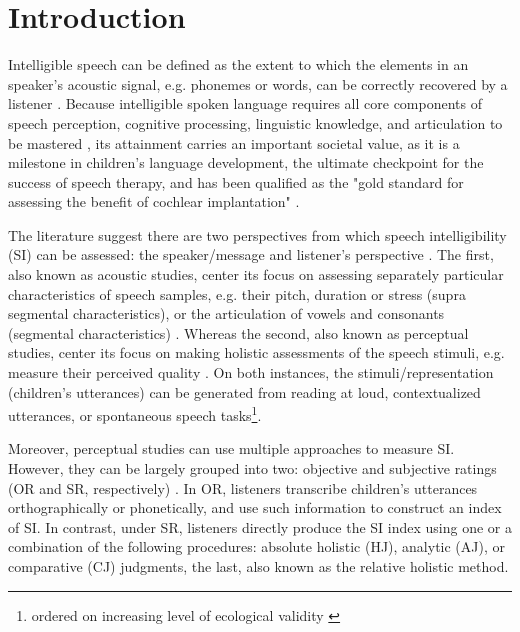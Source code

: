 \section{Introduction}

Intelligible speech can be defined as the extent to which the elements in an speaker's acoustic signal, e.g. phonemes or words, can be correctly recovered by a listener \citep{Kent_et_al_1989, Whitehill_et_al_2004, vanHeuven_2008, Freeman_et_al_2017}. Because intelligible spoken language requires all core components of speech perception, cognitive processing, linguistic knowledge, and articulation to be mastered \citep{Freeman_et_al_2017}, its attainment carries an important societal value, as it is a milestone in children's language development, the ultimate checkpoint for the success of speech therapy, and has been qualified as the "gold standard for assessing the benefit of cochlear implantation" \citep{Chin_et_al_2012}. 

The literature suggest there are two perspectives from which speech intelligibility (SI) can be assessed: the speaker/message and listener's perspective \citep{Boonen_et_al_2020, Boonen_et_al_2021}. The first, also known as acoustic studies, center its focus on assessing separately particular characteristics of speech samples, e.g. their pitch, duration or stress (supra segmental characteristics), or the articulation of vowels and consonants (segmental characteristics) \citep{Rowe_et_al_2018}. Whereas the second, also known as perceptual studies, center its focus on making holistic assessments of the speech stimuli, e.g. measure their perceived quality \citep{Boonen_et_al_2020, Boonen_et_al_2021}. On both instances, the stimuli/representation (children's utterances) can be generated from reading at loud, contextualized utterances, or spontaneous speech tasks\footnote{ordered on increasing level of ecological validity \citep{Flipsen_2006,Ertmer_2011}}.

\begin{comment}
Based on their description, it seems that that perceptual studies are more subjective than acoustic studies, as they do not rely on "objective" measurements, i.e. time duration, wave amplitude, among others, available in the former. However, for the case of SI, there are objective and subjective assessment methodologies.
\end{comment}

Moreover, perceptual studies can use multiple approaches to measure SI. However, they can be largely grouped into two: objective and subjective ratings (OR and SR, respectively) \citep{Hustad_et_al_2020}. In OR, listeners transcribe children's utterances orthographically or phonetically, and use such information to construct an index of SI. In contrast, under SR, listeners directly produce the SI index using one or a combination of the following procedures: absolute holistic (HJ), analytic (AJ), or comparative (CJ) judgments, the last, also known as the relative holistic method. 

